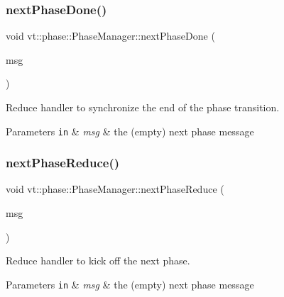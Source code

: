 \subsubsection{\texorpdfstring{next\+Phase\+Done()}{nextPhaseDone()}}
{\footnotesize\ttfamily void vt\+::phase\+::\+Phase\+Manager\+::next\+Phase\+Done (\begin{DoxyParamCaption}\item[{\hyperlink{structvt_1_1phase_1_1_next_msg}{Next\+Msg} $\ast$}]{msg }\end{DoxyParamCaption})\hspace{0.3cm}{\ttfamily [private]}}



Reduce handler to synchronize the end of the phase transition. 


\begin{DoxyParams}[1]{Parameters}
\mbox{\tt in}  & {\em msg} & the (empty) next phase message \\
\hline
\end{DoxyParams}
\mbox{\label{structvt_1_1phase_1_1_phase_manager_a59345a6496fb1413de1a1899fe4532cf}} 
\subsubsection{\texorpdfstring{next\+Phase\+Reduce()}{nextPhaseReduce()}}
{\footnotesize\ttfamily void vt\+::phase\+::\+Phase\+Manager\+::next\+Phase\+Reduce (\begin{DoxyParamCaption}\item[{\hyperlink{structvt_1_1phase_1_1_next_msg}{Next\+Msg} $\ast$}]{msg }\end{DoxyParamCaption})\hspace{0.3cm}{\ttfamily [private]}}



Reduce handler to kick off the next phase. 


\begin{DoxyParams}[1]{Parameters}
\mbox{\tt in}  & {\em msg} & the (empty) next phase message \\
\hline
\end{DoxyParams}
\mbox{\label{structvt_1_1phase_1_1_phase_manager_a43135040234c7d54396a70a3b27d79cd}} 
